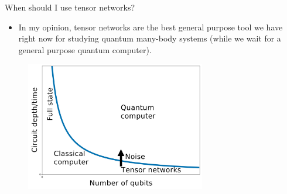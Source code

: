 \begin{frame}{When should I use tensor networks?}

\begin{itemize}[<+->]

  \item In my opinion, tensor networks are the best general purpose tool we have right now for studying quantum many-body systems (while we wait for a general purpose quantum computer).

\end{itemize}

\begin{figure}[T]
  \includegraphics[width=0.7\textwidth]{
    slides/assets/plots/quantum-volume/quantum-volume.jpg
  }
\end{figure}

\end{frame}

